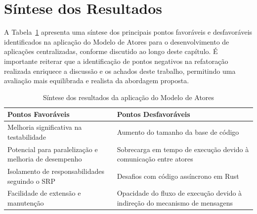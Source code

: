 \section{Síntese dos Resultados}

A Tabela~\ref{tab:sintese-resultados} apresenta uma síntese dos principais pontos favoráveis e desfavoráveis identificados na aplicação do Modelo de Atores para o desenvolvimento de aplicações centralizadas, conforme discutido ao longo deste capítulo. É importante reiterar que a identificação de pontos negativos na refatoração realizada enriquece a discussão e os achados deste trabalho, permitindo uma avaliação mais equilibrada e realista da abordagem proposta.

\begin{table}[htbp]
\centering
\caption{Síntese dos resultados da aplicação do Modelo de Atores}
\label{tab:sintese-resultados}
\begin{tabular}{|p{}|p{}|}
\hline
\textbf{Pontos Favoráveis} & \textbf{Pontos Desfavoráveis} \\
\hline
Melhoria significativa na testabilidade & Aumento do tamanho da base de código \\
\hline
Potencial para paralelização e melhoria de desempenho & Sobrecarga em tempo de execução devido à comunicação entre atores \\
\hline
Isolamento de responsabilidades seguindo o SRP & Desafios com código assíncrono em Rust \\
\hline
Facilidade de extensão e manutenção & Opacidade do fluxo de execução devido à indireção do mecanismo de mensagens \\
\hline
\end{tabular}
\end{table}

